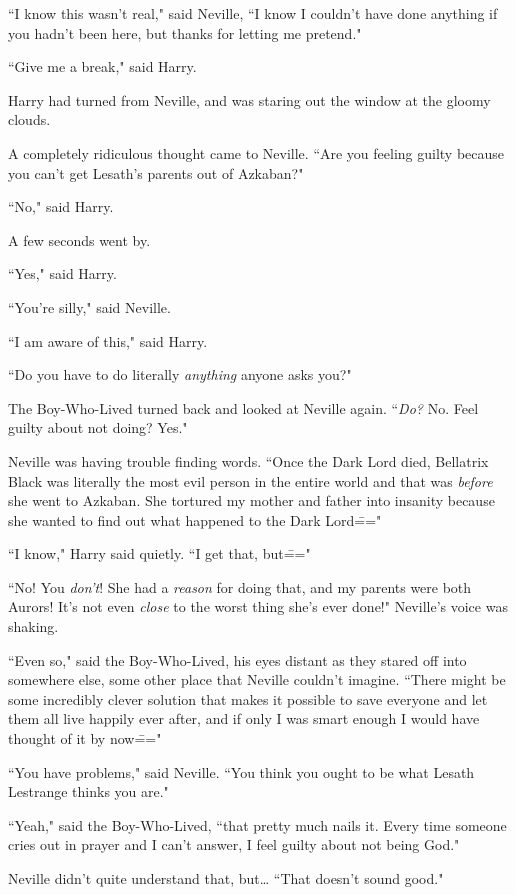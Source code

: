 ``I know this wasn't real," said Neville, ``I know I couldn't have done anything if you hadn't been here, but thanks for letting me pretend."

``Give me a break," said Harry.

Harry had turned from Neville, and was staring out the window at the gloomy clouds.

A completely ridiculous thought came to Neville. ``Are you feeling guilty because you can't get Lesath's parents out of Azkaban?"

``No," said Harry.

A few seconds went by.

``Yes," said Harry.

``You're silly," said Neville.

``I am aware of this," said Harry.

``Do you have to do literally \emph{anything} anyone asks you?"

The Boy-Who-Lived turned back and looked at Neville again. ``\emph{Do?} No. Feel guilty about not doing? Yes."

Neville was having trouble finding words. ``Once the Dark Lord died, Bellatrix Black was literally the most evil person in the entire world and that was \emph{before} she went to Azkaban. She tortured my mother and father into insanity because she wanted to find out what happened to the Dark Lord\==="

``I know," Harry said quietly. ``I get that, but\==="

``No! You \emph{don't}! She had a \emph{reason} for doing that, and my parents were both Aurors! It's not even \emph{close} to the worst thing she's ever done!" Neville's voice was shaking.

``Even so," said the Boy-Who-Lived, his eyes distant as they stared off into somewhere else, some other place that Neville couldn't imagine. ``There might be some incredibly clever solution that makes it possible to save everyone and let them all live happily ever after, and if only I was smart enough I would have thought of it by now\==="

``You have problems," said Neville. ``You think you ought to be what Lesath Lestrange thinks you are."

``Yeah," said the Boy-Who-Lived, ``that pretty much nails it. Every time someone cries out in prayer and I can't answer, I feel guilty about not being God."

Neville didn't quite understand that, but{\ldots} ``That doesn't sound good."

